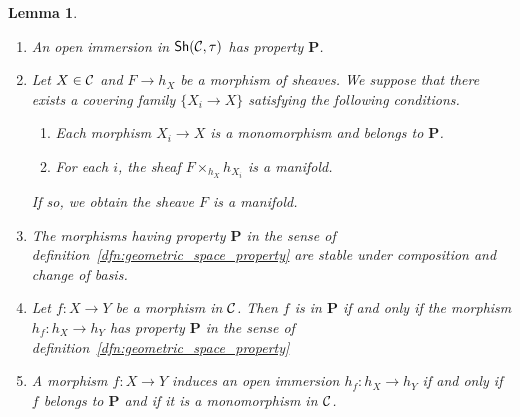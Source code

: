 \documentclass{tufte-book} %
\numberwithin{dummy}{section}
\newtheorem{lemma}[thm]{Lemma}
\newcommand{\calc}{{\cal C}}
\newcommand{\lrta}{\longrightarrow}
\newcommand{\ssh}{\mathsf{Sh}}
\newcommand{\bfp}{\mathbf{P}}
\begin{document}
\begin{lemma}
\ 
\begin{enumerate}
\item An open immersion in $\ssh(\calc,\tau)$ has property $\bfp$.
\item Let $X\in\calc$ and $F\lrta h_X$ be a morphism of sheaves. We suppose that there exists a covering family $\{X_i\lrta X\}$ satisfying the following conditions.
\begin{enumerate}[label=(\alph*)]
\item Each morphism $X_i\lrta X$ is a monomorphism  and belongs to $\bfp$.
\item For each $i$, the sheaf $F\times_{h_X}h_{X_i}$ is a manifold.
\end{enumerate}
If so, we obtain the sheave $F$ is a manifold.
\item The morphisms having property $\bfp$ in the sense of definition~\ref{dfn:geometric_space_property} are stable under composition and change of basis.
\item Let $f:X\lrta Y$ be  a morphism in $\calc$. Then $f$ is in $\bfp$ if and only if the morphism $h_f:h_X\lrta h_Y$ has property $\bfp$ in the sense of definition~\ref{dfn:geometric_space_property}
\item A morphism $f:X\lrta Y$ induces an open immersion $h_f:h_X\lrta h_Y$ if and only if $f$ belongs to  $\bfp$ and if it is a monomorphism in $\calc$.
\end{enumerate}
\end{lemma}
\end{document}
